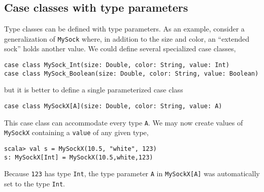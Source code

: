 \subsection{Case classes with type parameters}

Type classes can be defined with type parameters.
As an example, consider a generalization of \lstinline!MySock! where,
in addition to the size and color, an \textsf{``}extended sock\textsf{''} holds another
value. We could define several specialized case classes,
\begin{lstlisting}
case class MySock_Int(size: Double, color: String, value: Int)
case class MySock_Boolean(size: Double, color: String, value: Boolean)
\end{lstlisting}
but it is better to define a single parameterized case class
\begin{lstlisting}
case class MySockX[A](size: Double, color: String, value: A)
\end{lstlisting}
This case class can accommodate every type \lstinline!A!. We may
now create values of \lstinline!MySockX! containing a \lstinline!value!
of any given type,
\begin{lstlisting}
scala> val s = MySockX(10.5, "white", 123)
s: MySockX[Int] = MySockX(10.5,white,123) 
\end{lstlisting}
Because \lstinline!123! has type \lstinline!Int!, the type parameter
\lstinline!A! in \lstinline!MySockX[A]! was automatically set to
the type \lstinline!Int!. 

